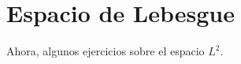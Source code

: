 \documentclass[11pt]{report}
\newtheorem{ex}{Ejercicio}
\newenvironment{solution}{\begin{proof}[Solución]}{\end{proof}}
\newcommand{\inner}[2]{( #1, #2 )_V}
\newcommand{\norma}[1]{\Vert #1 \Vert_V}
\begin{document}











\section{Espacio de Lebesgue}

\noindent
Ahora, algunos ejercicios sobre el espacio $L^2$. %
\end{document}
